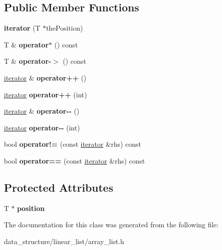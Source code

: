 \subsection*{Public Member Functions}
\begin{DoxyCompactItemize}
\item 
\mbox{\label{classiterator_aeefbadab3a70434fd7209e53cfde1eda}} 
{\bfseries iterator} (T $\ast$the\+Position)
\item 
\mbox{\label{classiterator_a812b6eb54f898651c5f3843d3bc6b304}} 
T \& {\bfseries operator$\ast$} () const
\item 
\mbox{\label{classiterator_ac6dc72b0fe61dd7eaff65dae06f546e6}} 
T \& {\bfseries operator-\/$>$} () const
\item 
\mbox{\label{classiterator_ac7aa9929d22f3537fec4199f78d5ea0f}} 
\hyperlink{classiterator}{iterator} \& {\bfseries operator++} ()
\item 
\mbox{\label{classiterator_aee23ee83b4ada171ef7b5d84023a9a86}} 
\hyperlink{classiterator}{iterator} {\bfseries operator++} (int)
\item 
\mbox{\label{classiterator_aece894a066138fd746018c25b66aa21b}} 
\hyperlink{classiterator}{iterator} \& {\bfseries operator-\/-\/} ()
\item 
\mbox{\label{classiterator_a03399efe64e2576f58af280a93f6b0e2}} 
\hyperlink{classiterator}{iterator} {\bfseries operator-\/-\/} (int)
\item 
\mbox{\label{classiterator_a41525a41e1b5975155f4908c3446163f}} 
bool {\bfseries operator!=} (const \hyperlink{classiterator}{iterator} \&rhs) const
\item 
\mbox{\label{classiterator_af5ae5f2473c7b117149354b660ce7cfd}} 
bool {\bfseries operator==} (const \hyperlink{classiterator}{iterator} \&rhs) const
\end{DoxyCompactItemize}
\subsection*{Protected Attributes}
\begin{DoxyCompactItemize}
\item 
\mbox{\label{classiterator_ad4b129783502be6635bb37f463ba0998}} 
T $\ast$ {\bfseries position}
\end{DoxyCompactItemize}


The documentation for this class was generated from the following file\+:\begin{DoxyCompactItemize}
\item 
data\+\_\+structure/linear\+\_\+list/array\+\_\+list.\+h\end{DoxyCompactItemize}
